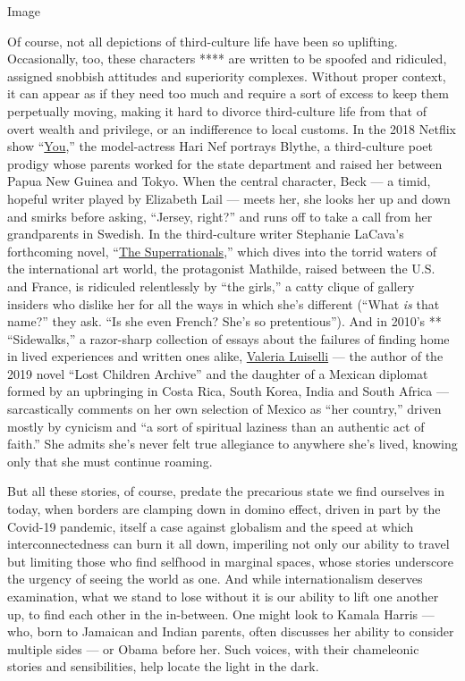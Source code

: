 Image

Of course, not all depictions of third-culture life have been so
uplifting. Occasionally, too, these characters **** are written to be
spoofed and ridiculed, assigned snobbish attitudes and superiority
complexes. Without proper context, it can appear as if they need too
much and require a sort of excess to keep them perpetually moving,
making it hard to divorce third-culture life from that of overt wealth
and privilege, or an indifference to local customs. In the 2018 Netflix
show
``\href{https://www.nytimes3xbfgragh.onion/2019/01/24/arts/television/penn-badgley-you-netflix.html}{You},''
the model-actress Hari Nef portrays Blythe, a third-culture poet prodigy
whose parents worked for the state department and raised her between
Papua New Guinea and Tokyo. When the central character, Beck --- a
timid, hopeful writer played by Elizabeth Lail --- meets her, she looks
her up and down and smirks before asking, ``Jersey, right?'' and runs
off to take a call from her grandparents in Swedish. In the
third-culture writer Stephanie LaCava's forthcoming novel,
``\href{https://mitpress.mit.edu/books/superrationals}{The
Superrationals},'' which dives into the torrid waters of the
international art world, the protagonist Mathilde, raised between the
U.S. and France, is ridiculed relentlessly by ``the girls,'' a catty
clique of gallery insiders who dislike her for all the ways in which
she's different (``What \emph{is} that name?'' they ask. ``Is she even
French? She's so pretentious''). And in 2010's ** ``Sidewalks,'' a
razor-sharp collection of essays about the failures of finding home in
lived experiences and written ones alike,
\href{https://www.nytimes3xbfgragh.onion/2019/02/07/arts/valeria-luiselli-lost-children-archive.html}{Valeria
Luiselli} --- the author of the 2019 novel ``Lost Children Archive'' and
the daughter of a Mexican diplomat formed by an upbringing in Costa
Rica, South Korea, India and South Africa --- sarcastically comments on
her own selection of Mexico as ``her country,'' driven mostly by
cynicism and ``a sort of spiritual laziness than an authentic act of
faith.'' She admits she's never felt true allegiance to anywhere she's
lived, knowing only that she must continue roaming.

But all these stories, of course, predate the precarious state we find
ourselves in today, when borders are clamping down in domino effect,
driven in part by the Covid-19 pandemic, itself a case against globalism
and the speed at which interconnectedness can burn it all down,
imperiling not only our ability to travel but limiting those who find
selfhood in marginal spaces, whose stories underscore the urgency of
seeing the world as one. And while internationalism deserves
examination, what we stand to lose without it is our ability to lift one
another up, to find each other in the in-between. One might look to
Kamala Harris --- who, born to Jamaican and Indian parents, often
discusses her ability to consider multiple sides --- or Obama before
her. Such voices, with their chameleonic stories and sensibilities, help
locate the light in the dark.

